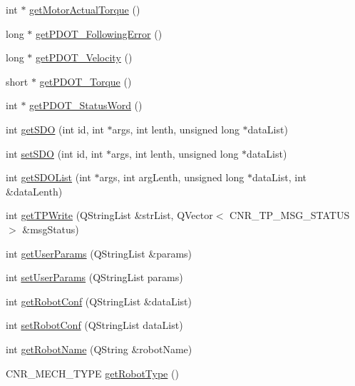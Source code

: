 \begin{DoxyCompactItemize}
\item 
int $\ast$ \hyperlink{classCUIApp_a022c1b824525745e09c6080c22ac179a}{get\-Motor\-Actual\-Torque} ()
\item 
long $\ast$ \hyperlink{classCUIApp_a3c11238c75f11140c7bc79ec6c69d175}{get\-P\-D\-O\-T\-\_\-\-Following\-Error} ()
\item 
long $\ast$ \hyperlink{classCUIApp_a7b5fcf976a2f6b7c5d396ad379cfe30a}{get\-P\-D\-O\-T\-\_\-\-Velocity} ()
\item 
short $\ast$ \hyperlink{classCUIApp_a1aad67b6ffa78081b285c4b55b601b93}{get\-P\-D\-O\-T\-\_\-\-Torque} ()
\item 
int $\ast$ \hyperlink{classCUIApp_adfc9ee94df8b0e299985f4e7de4e9755}{get\-P\-D\-O\-T\-\_\-\-Status\-Word} ()
\item 
int \hyperlink{classCUIApp_a339bd304f36c7eafa52efd7d06742b33}{get\-S\-D\-O} (int id, int $\ast$args, int lenth, unsigned long $\ast$data\-List)
\item 
int \hyperlink{classCUIApp_a7db69eefe8a46e4e7b2791ada7efe719}{set\-S\-D\-O} (int id, int $\ast$args, int lenth, unsigned long $\ast$data\-List)
\item 
int \hyperlink{classCUIApp_af91843d583fe4bd9b12abf1ea1d04bea}{get\-S\-D\-O\-List} (int $\ast$args, int arg\-Lenth, unsigned long $\ast$data\-List, int \&data\-Lenth)
\item 
int \hyperlink{classCUIApp_ad6d72a0b565f779b61eb0b4e71810a77}{get\-T\-P\-Write} (Q\-String\-List \&str\-List, Q\-Vector$<$ C\-N\-R\-\_\-\-T\-P\-\_\-\-M\-S\-G\-\_\-\-S\-T\-A\-T\-U\-S $>$ \&msg\-Status)
\item 
int \hyperlink{classCUIApp_af65c69d76062c8c0b9eded1761c1e7e9}{get\-User\-Params} (Q\-String\-List \&params)
\item 
int \hyperlink{classCUIApp_a8e509954cca273e527eafc4fde64a0b2}{set\-User\-Params} (Q\-String\-List params)
\item 
int \hyperlink{classCUIApp_a674f263816eeb0bdb7b68439f421260a}{get\-Robot\-Conf} (Q\-String\-List \&data\-List)
\item 
int \hyperlink{classCUIApp_a72fc3d4ed526cc68125ad588f67b5425}{set\-Robot\-Conf} (Q\-String\-List data\-List)
\item 
int \hyperlink{classCUIApp_a9a5718d007c4d0dec21ad234a2827dc2}{get\-Robot\-Name} (Q\-String \&robot\-Name)
\item 
C\-N\-R\-\_\-\-M\-E\-C\-H\-\_\-\-T\-Y\-P\-E \hyperlink{classCUIApp_a33d884ef8a808b2868dbbc47e05e2ac2}{get\-Robot\-Type} ()
\item 

\end{DoxyCompactItemize}
